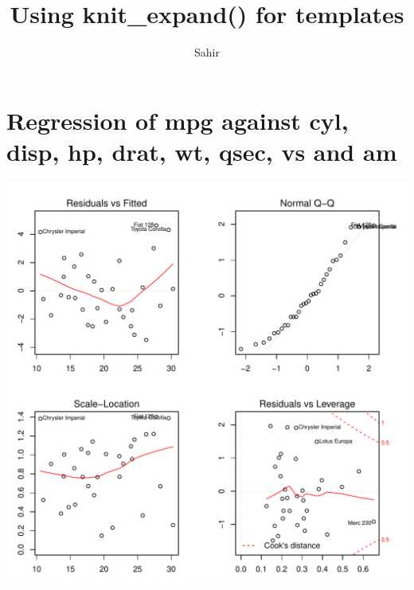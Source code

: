 \documentclass{article}\usepackage[]{graphicx}\usepackage[]{color}
\title{Using knit\_expand() for templates}
\author{Sahir}
\makeatletter
\def\maxwidth{ %
  \ifdim\Gin@nat@width>\linewidth
    \linewidth
  \else
    \Gin@nat@width
  \fi
}
\newenvironment{knitrout}{}{} %
\makeatother
\begin{document}
\maketitle
\tableofcontents







\section{Regression of mpg against cyl, disp, hp, drat, wt, qsec, vs and am }
\begin{knitrout}
\color{fgcolor}

{\centering \includegraphics[width=\maxwidth]{figure/lm-cyl-disp-hp-drat-wt-qsec-vs-am} 

}



\end{knitrout}
\end{document}
